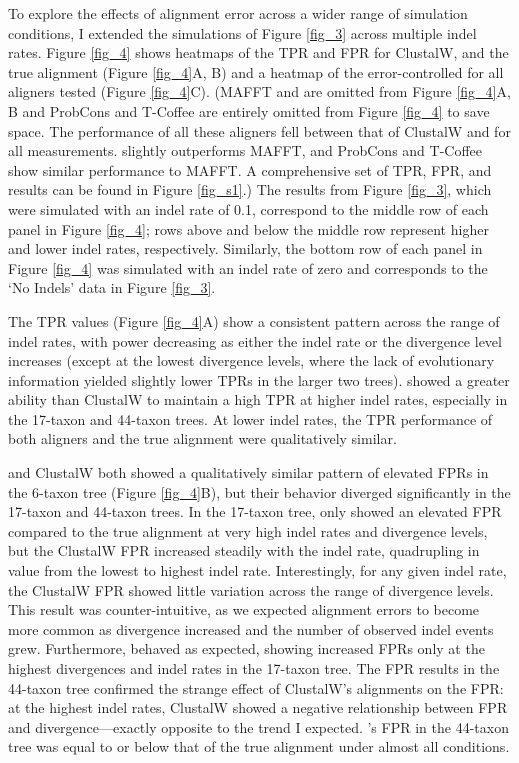 To explore the effects of alignment error across a wider range of
simulation conditions, I extended the simulations of Figure
\ref{fig_3} across multiple indel rates. Figure \ref{fig_4} shows
heatmaps of the TPR and FPR for ClustalW, \prankc and the true
alignment (Figure \ref{fig_4}A, B) and a heatmap of the
error-controlled \tpr for all aligners tested (Figure \ref{fig_4}C).
(MAFFT and \pranka are omitted from Figure \ref{fig_4}A, B and
  ProbCons and T-Coffee are entirely omitted from Figure \ref{fig_4}
  to save space. The performance of all these aligners fell between
  that of ClustalW and \prankc for all measurements. \pranka slightly
  outperforms MAFFT, and ProbCons and T-Coffee show similar
  performance to MAFFT. A comprehensive set of TPR, FPR, and \tpr
  results can be found in Figure \ref{fig_s1}.) The results from
Figure \ref{fig_3}, which were simulated with an indel rate of 0.1,
correspond to the middle row of each panel in Figure \ref{fig_4}; rows
above and below the middle row represent higher and lower indel rates,
respectively. Similarly, the bottom row of each panel in Figure
\ref{fig_4} was simulated with an indel rate of zero and corresponds
to the `No Indels' data in Figure \ref{fig_3}.

The TPR values (Figure \ref{fig_4}A) show a consistent pattern
across the range of indel rates, with power decreasing as either the
indel rate or the divergence level increases (except at the lowest
divergence levels, where the lack of evolutionary information yielded
slightly lower TPRs in the larger two trees). \prankc{} showed a
greater ability than ClustalW to maintain a high TPR at higher indel
rates, especially in the 17-taxon and 44-taxon trees. At lower indel
rates, the TPR performance of both aligners and the true alignment
were qualitatively similar.

\prankc{} and ClustalW both showed a qualitatively similar pattern of
elevated FPRs in the 6-taxon tree (Figure \ref{fig_4}B), but their
behavior diverged significantly in the 17-taxon and 44-taxon trees. In
the 17-taxon tree, \prankc{} only showed an elevated FPR compared to
the true alignment at very high indel rates and divergence levels, but
the ClustalW FPR increased steadily with the indel rate, quadrupling
in value from the lowest to highest indel rate. Interestingly, for any
given indel rate, the ClustalW FPR showed little variation across the
range of divergence levels. This result was counter-intuitive, as we
expected alignment errors to become more common as divergence
increased and the number of observed indel events grew. Furthermore,
\prankc{} behaved as expected, showing increased
FPRs only at the highest divergences and indel rates in the 17-taxon
tree. The FPR results in the 44-taxon tree confirmed the strange
effect of ClustalW's alignments on the \sw FPR: at the highest indel
rates, ClustalW showed a negative relationship between FPR and
divergence---exactly opposite to the trend I expected. \prankc{}'s
FPR in the 44-taxon tree was equal to or below that of the true
alignment under almost all conditions.

